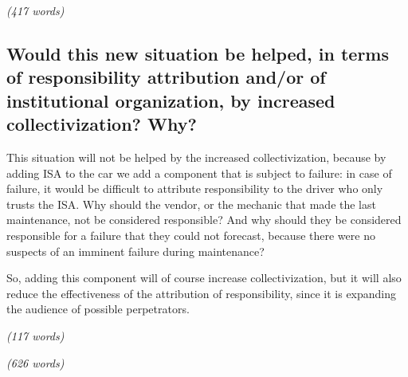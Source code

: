 \emph{(417 words)}
\newpage
\subsection{Would this new situation be helped, in terms of responsibility attribution and/or of institutional organization, by increased collectivization? Why?}
This situation will not be helped by the increased collectivization, because by adding ISA to the car we add a component that is subject to failure: in case of failure, it would be difficult to attribute responsibility to the driver who only trusts the ISA. Why should the vendor, or the mechanic that made the last maintenance, not be considered responsible? And why should they be considered responsible for a failure that they could not forecast, because there were no suspects of an imminent failure during maintenance?

So, adding this component will of course increase collectivization, but it will also reduce the effectiveness of the attribution of responsibility, since it is expanding the audience of possible perpetrators.

\emph{(117 words)}

\emph{(626 words)}

\newpage

